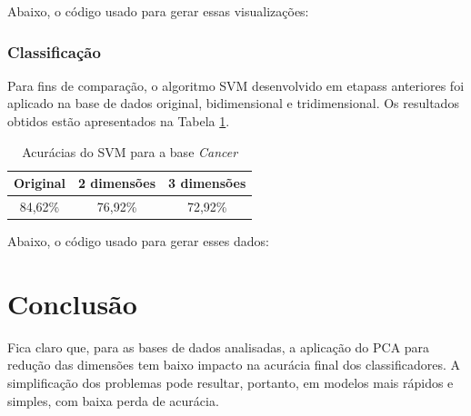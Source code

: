 \documentclass[a4paper]{article}
\begin{document}
Abaixo, o código usado para gerar essas visualizações:



\subsubsection{Classificação}

Para fins de comparação, o algoritmo SVM desenvolvido em etapass anteriores foi aplicado na base de dados original, bidimensional e tridimensional. Os resultados obtidos estão apresentados na Tabela \ref{tab:cancer}.

\begin{table}[H]
	\centering
	\caption{Acurácias do SVM para a base \textit{Cancer}}
	\thinspace
	\label{tab:cancer}
\begin{tabular}{ c | c | c }
	Original & 2 dimensões & 3 dimensões\\
	\hline
	84,62\% & 76,92\% & 72,92\% \\
\end{tabular}
\end{table}

Abaixo, o código usado para gerar esses dados:



\section{Conclusão}

Fica claro que, para as bases de dados analisadas, a aplicação do PCA para redução das dimensões tem baixo impacto na acurácia final dos classificadores. A simplificação dos problemas pode resultar, portanto, em modelos mais rápidos e simples, com baixa perda de acurácia.
\end{document}

